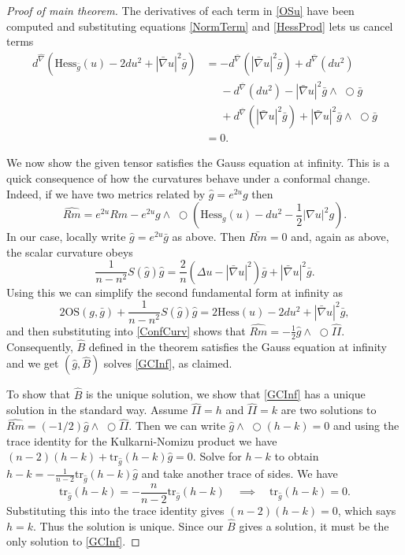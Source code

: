 \documentclass{amsart}
\newcommand{\two}{I\!\!I}
\newcommand{\tr}{\mathrm{tr}}
\newcommand{\wtimes}{\wedge \!\!\!\!\!\!\!\!\;\bigcirc}
\begin{document}
\begin{proof}[Proof of main theorem]
The derivatives of each term in \eqref{OSu} have been computed and substituting equations \eqref{NormTerm} and \eqref{HessProd} lets us cancel terms
\begin{align*}
d^{\hat{\nabla}}\left(\mathrm{Hess}_{\bar{g}}(u) - 2 du^2 + |\bar{\nabla}u|^2 \bar{g} \right)
&= -d^{\bar{\nabla}}(|\bar{\nabla}u|^2\bar{g}) + d^{\bar{\nabla}}(du^2) \\
&\phantom{=} - d^{\bar{\nabla}}(du^2) - |\bar{\nabla}u|^2\bar{g}\wtimes\bar{g} \\
&\phantom{=} + d^{\bar{\nabla}}(|\bar{\nabla}u|^2\bar{g}) + |\bar{\nabla}u|^2\bar{g}\wtimes\bar{g} \\
&= 0.
\end{align*}

We now show the given tensor satisfies the Gauss equation at infinity.
This is a quick consequence of how the curvatures behave under a conformal change.
Indeed, if we have two metrics related by $\hat{g} = e^{2u}g$ then 
\begin{equation}
\label{ConfCurv}
\hat{Rm} = e^{2u}Rm - e^{2u}g\wtimes(\mathrm{Hess}_g(u) - du^2 - \frac{1}{2}|\nabla u|^2g).
\end{equation}
In our case, locally write $\hat{g} = e^{2u}\bar{g}$ as above.
Then $\bar{Rm} = 0$ and, again as above, the scalar curvature obeys 
\[
\frac{1}{n-n^2}S(\hat{g})\hat{g}
= \frac{2}{n}\left( \Delta u - |\bar{\nabla}u|^2\right)\bar{g} + |\bar{\nabla}u|^2\bar{g}.
\]
Using this we can simplify the second fundamental form at infinity as 
\[
2\mathrm{OS}(g,\bar{g}) + \frac{1}{n-n^2}S(\hat{g})\hat{g} 
= 2\mathrm{Hess}(u) - 2du^2 + |\bar{\nabla}u|^2\bar{g},
\]
and then substituting into \eqref{ConfCurv} shows that $\hat{Rm} = -\frac{1}{2}\hat{g}\wtimes \hat{\two}$.
Consequently, $\hat{B}$ defined in the theorem satisfies the Gauss equation at infinity and we get $(\hat{g},\hat{B})$ solves \ref{GCInf}, as claimed.

To show that $\hat{B}$ is the unique solution, we show that \ref{GCInf} has a unique solution in the standard way.
Assume $\hat{\two} = h$ and $\hat{\two} = k$ are two solutions to $\hat{Rm} = (-1/2)\hat{g}\wtimes\hat{\two}$.
Then we can write $\hat{g}\wtimes (h-k) = 0$ and using the trace identity for the Kulkarni-Nomizu product we have $(n-2)(h-k) + \tr_{\hat{g}}(h-k)\hat{g} = 0$.
Solve for $h-k$ to obtain $h-k = -\frac{1}{n-2}\tr_{\hat{g}}(h-k)\hat{g}$ and take another trace of sides.
We have
\[
\tr_{\hat{g}}(h-k) = -\frac{n}{n-2}\tr_{\hat{g}}(h-k) \quad \implies \quad \tr_{\hat{g}}(h-k) = 0.
\]
Substituting this into the trace identity gives $(n-2)(h-k) = 0$, which says $h=k$.
Thus the solution is unique.
Since our $\hat{B}$ gives a solution, it must be the only solution to \ref{GCInf}. 
\end{proof}
\end{document}
